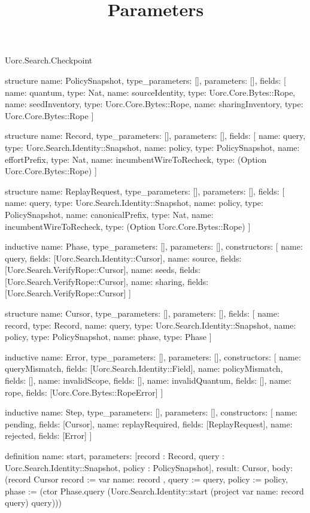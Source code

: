 \begin{lexlean}{Uorc.Search.Checkpoint}
\title{Parameters}
\begin{semanticmodule}
structure{
  name: PolicySnapshot,
  type_parameters: [],
  parameters: [],
  fields: [
    {name: quantum, type: Nat},
    {name: sourceIdentity, type: Uorc.Core.Bytes::Rope},
    {name: seedInventory, type: Uorc.Core.Bytes::Rope},
    {name: sharingInventory, type: Uorc.Core.Bytes::Rope}
  ]
}

structure{
  name: Record,
  type_parameters: [],
  parameters: [],
  fields: [
    {name: query, type: Uorc.Search.Identity::Snapshot},
    {name: policy, type: PolicySnapshot},
    {name: effortPrefix, type: Nat},
    {name: incumbentWireToRecheck, type: (Option Uorc.Core.Bytes::Rope)}
  ]
}

structure{
  name: ReplayRequest,
  type_parameters: [],
  parameters: [],
  fields: [
    {name: query, type: Uorc.Search.Identity::Snapshot},
    {name: policy, type: PolicySnapshot},
    {name: canonicalPrefix, type: Nat},
    {name: incumbentWireToRecheck, type: (Option Uorc.Core.Bytes::Rope)}
  ]
}

inductive{
  name: Phase,
  type_parameters: [],
  parameters: [],
  constructors: [
    {name: query, fields: [Uorc.Search.Identity::Cursor]},
    {name: source, fields: [Uorc.Search.VerifyRope::Cursor]},
    {name: seeds, fields: [Uorc.Search.VerifyRope::Cursor]},
    {name: sharing, fields: [Uorc.Search.VerifyRope::Cursor]}
  ]
}

structure{
  name: Cursor,
  type_parameters: [],
  parameters: [],
  fields: [
    {name: record, type: Record},
    {name: query, type: Uorc.Search.Identity::Snapshot},
    {name: policy, type: PolicySnapshot},
    {name: phase, type: Phase}
  ]
}

inductive{
  name: Error,
  type_parameters: [],
  parameters: [],
  constructors: [
    {name: queryMismatch, fields: [Uorc.Search.Identity::Field]},
    {name: policyMismatch, fields: []},
    {name: invalidScope, fields: []},
    {name: invalidQuantum, fields: []},
    {name: rope, fields: [Uorc.Core.Bytes::RopeError]}
  ]
}

inductive{
  name: Step,
  type_parameters: [],
  parameters: [],
  constructors: [
    {name: pending, fields: [Cursor]},
    {name: replayRequired, fields: [ReplayRequest]},
    {name: rejected, fields: [Error]}
  ]
}

definition{
  name: start,
  parameters: [record : Record, query : Uorc.Search.Identity::Snapshot, policy : PolicySnapshot],
  result: Cursor,
  body: (record Cursor {record := var{
    name: record
  }, query := query, policy := policy, phase := (ctor Phase.query (Uorc.Search.Identity::start (project var{
    name: record
  } query) query))})
}


\end{semanticmodule}
\end{lexlean}
